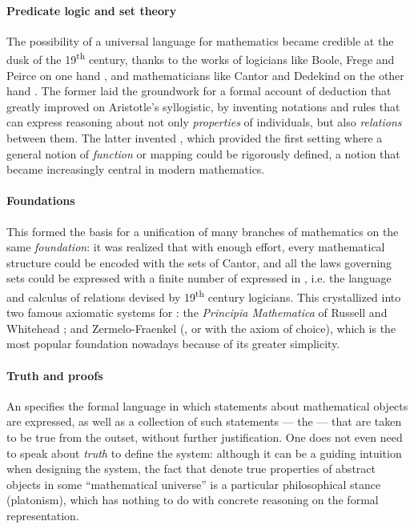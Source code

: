 \paragraph{Predicate logic and set theory}

The possibility of a universal language for mathematics became credible at the
dusk of the 19\textsuperscript{th} century, thanks to the works of logicians
like Boole, Frege and Peirce on one hand
, and mathematicians
like Cantor and Dedekind on the other hand
. The former laid the groundwork
for a formal account of deduction that greatly improved on Aristotle's
syllogistic, by inventing notations and rules that can express reasoning about
not only \emph{properties} of individuals, but also \emph{relations} between
them. The latter invented , which provided the first setting
where a general notion of \emph{function} or mapping could be rigorously
defined, a notion that became increasingly central in modern mathematics.

\paragraph{Foundations}

This formed the basis for a unification of many branches of mathematics on the
same \emph{foundation}: it was realized that with enough effort, every
mathematical structure could be encoded with the sets of Cantor, and all the
laws governing sets could be expressed with a finite number of 
expressed in , i.e. the language and calculus of
relations devised by 19\textsuperscript{th} century logicians. This crystallized
into two famous axiomatic systems for : the \textit{Principia
Mathematica} of Russell and Whitehead ; and Zermelo-Fraenkel
 (, or  with the axiom of choice), which is
the most popular foundation nowadays because of its greater simplicity.

\paragraph{Truth and proofs}

An  specifies the formal language in which statements
about mathematical objects are expressed, as well as a collection of such
statements --- the  --- that are taken to be true from the outset,
without further justification. One does not even need to speak about
\emph{truth} to define the system: although it can be a guiding intuition when
designing the system, the fact that  denote true properties of
abstract objects in some ``mathematical universe'' is a particular philosophical
stance (platonism), which has nothing to do with concrete reasoning on the
formal representation.

